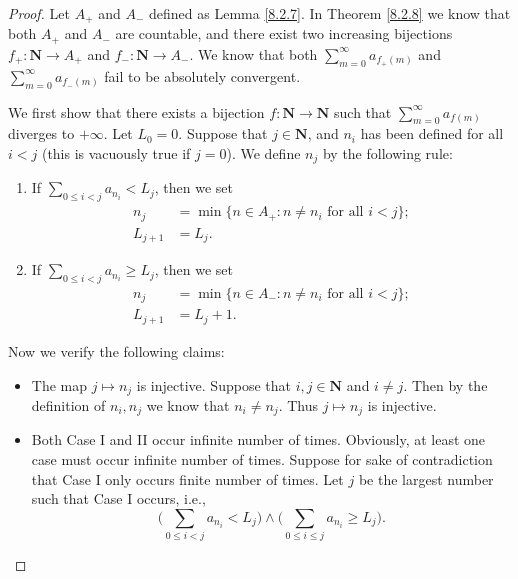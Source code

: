 \begin{proof}
    Let \(A_+\) and \(A_-\) defined as Lemma \ref{8.2.7}.
    In Theorem \ref{8.2.8} we know that both \(A_+\) and \(A_-\) are countable, and there exist two increasing bijections \(f_+ : \mathbf{N} \to A_+\) and \(f_- : \mathbf{N} \to A_-\).
    We know that both \(\sum_{m = 0}^\infty a_{f_+(m)}\) and \(\sum_{m = 0}^\infty a_{f_-(m)}\) fail to be absolutely convergent.

    We first show that there exists a bijection \(f : \mathbf{N} \to \mathbf{N}\) such that \(\sum_{m = 0}^\infty a_{f(m)}\) diverges to \(+\infty\).
    Let \(L_0 = 0\).
    Suppose that \(j \in \mathbf{N}\), and \(n_i\) has been defined for all \(i < j\)
    (this is vacuously true if \(j = 0\)).
    We define \(n_j\) by the following rule:
    \begin{enumerate}[label=(\Roman*)]
        \item If \(\sum_{0 \leq i < j} a_{n_i} < L_j\), then we set
              \begin{align*}
                  n_j       & = \min\{n \in A_+ : n \neq n_i \text{ for all } i < j\}; \\
                  L_{j + 1} & = L_j.
              \end{align*}
        \item If \(\sum_{0 \leq i < j} a_{n_i} \geq L_j\), then we set
              \begin{align*}
                  n_j       & = \min\{n \in A_- : n \neq n_i \text{ for all } i < j\}; \\
                  L_{j + 1} & = L_j + 1.
              \end{align*}
    \end{enumerate}
    Now we verify the following claims:
    \begin{itemize}
        \item The map \(j \mapsto n_j\) is injective.
              Suppose that \(i, j \in \mathbf{N}\) and \(i \neq j\).
              Then by the definition of \(n_i, n_j\) we know that \(n_i \neq n_j\).
              Thus \(j \mapsto n_j\) is injective.
        \item Both Case I and II occur infinite number of times.
              Obviously, at least one case must occur infinite number of times.
              Suppose for sake of contradiction that Case I only occurs finite number of times.
              Let \(j\) be the largest number such that Case I occurs, i.e.,
              \[
                  \Bigg(\sum_{0 \leq i < j} a_{n_i} < L_j\Bigg) \land \Bigg(\sum_{0 \leq i \leq j} a_{n_i} \geq L_j\Bigg).
\]
\end{itemize}
\end{proof}
